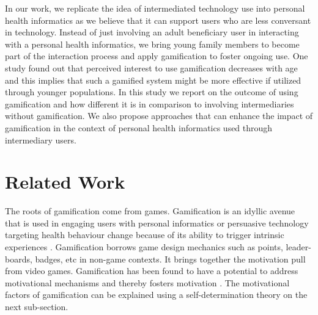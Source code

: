 \documentclass{sig-alternate}
\begin{document}
In our work, we replicate the idea of intermediated technology use into personal health informatics as we believe that it can support users who are less conversant in technology. Instead of just involving an adult beneficiary user in interacting with a personal health informatics, we bring young family members to become part of the interaction process and apply gamification to foster ongoing use. One study found out that perceived interest to use gamification decreases with age and this implies that such a gamified system might be more effective if utilized through younger populations\cite{v2014motivational}.\newline
In this study we report on the outcome of using gamification and how different it is in comparison to involving intermediaries without gamification. We also propose approaches that can enhance the impact of gamification in the context of personal health informatics used through intermediary users.
\section{Related Work} 
The roots of gamification come from games. Gamification is an idyllic avenue that is used in engaging users with personal informatics or persuasive technology targeting health behaviour change because of its ability to trigger intrinsic experiences \cite{hamari2014persuasive}. Gamification borrows game design mechanics such as points, leader-boards, badges, etc in non-game contexts\cite{deterding2011game}. It brings together the motivation pull from video games. Gamification has been found to have a potential to address motivational mechanisms and thereby fosters motivation \cite{sailer2013:psychological}. The motivational  factors of gamification can be explained using a self-determination theory on the next sub-section.    
\end{document}
